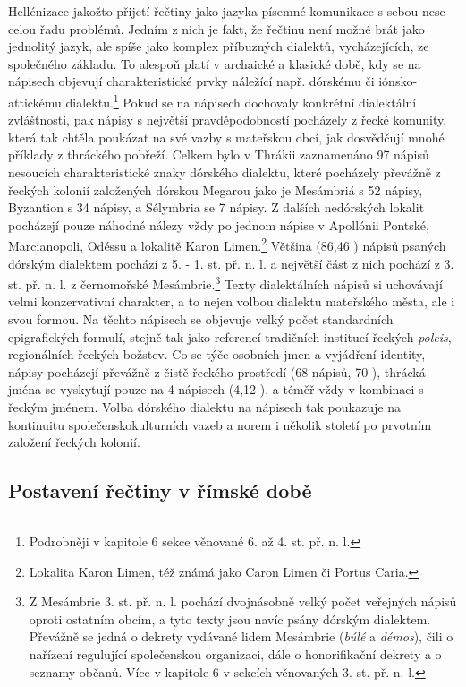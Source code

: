 Hellénizace jakožto přijetí řečtiny jako jazyka písemné komunikace s sebou nese celou řadu problémů. Jedním z nich je fakt, že řečtinu není možné brát jako jednolitý jazyk, ale spíše jako komplex příbuzných dialektů, vycházejících, ze společného základu. To alespoň platí v archaické a klasické době, kdy se na nápisech objevují charakteristické prvky náležící např. dórskému či iónsko-attickému dialektu.\footnote{Podrobněji v kapitole 6 sekce věnované 6. až 4. st. př. n. l.} Pokud se na nápisech dochovaly konkrétní dialektální zvláštnosti, pak nápisy s největší pravděpodobností pocházely z řecké komunity, která tak chtěla poukázat na své vazby s mateřskou obcí, jak dosvědčují mnohé příklady z thráckého pobřeží. Celkem bylo v Thrákii zaznamenáno 97 nápisů nesoucích charakteristické znaky dórského dialektu, které pocházely převážně z řeckých kolonií založených dórskou Megarou jako je Mesámbriá s 52 nápisy, Byzantion s 34 nápisy, a Sélymbria se 7 nápisy. Z dalších nedórských lokalit pocházejí pouze náhodné nálezy vždy po jednom nápise v Apollónii Pontské, Marcianopoli, Odéssu a lokalitě Karon Limen.\footnote{Lokalita Karon Limen, též známá jako Caron Limen či Portus Caria.} Většina (86,46 ) nápisů psaných dórským dialektem pochází z 5. - 1. st. př. n. l. a největší část z nich pochází z 3. st. př. n. l. z černomořské Mesámbrie.\footnote{Z Mesámbrie 3. st. př. n. l. pochází dvojnásobně velký počet veřejných nápisů oproti ostatním obcím, a tyto texty jsou navíc psány dórským dialektem. Převážně se jedná o dekrety vydávané lidem Mesámbrie ({\em búlé} a {\em démos}), čili o nařízení regulující společenskou organizaci, dále o honorifikační dekrety a o seznamy občanů. Více v kapitole 6 v sekcích věnovaných 3. st. př. n. l.} Texty dialektálních nápisů si uchovávají velmi konzervativní charakter, a to nejen volbou dialektu mateřského města, ale i svou formou. Na těchto nápisech se objevuje velký počet standardních epigrafických formulí, stejně tak jako referencí tradičních institucí řeckých {\em poleis}, regionálních řeckých božstev. Co se týče osobních jmen a vyjádření identity, nápisy pocházejí převážně z čistě řeckého prostředí (68 nápisů, 70 ), thrácká jména se vyskytují pouze na 4 nápisech (4,12 ), a téměř vždy v kombinaci s řeckým jménem. Volba dórského dialektu na nápisech tak poukazuje na kontinuitu společenskokulturních vazeb a norem i několik století po prvotním založení řeckých kolonií.

\subsection[postavení-řečtiny-v-římské-době]{Postavení řečtiny v římské době}

